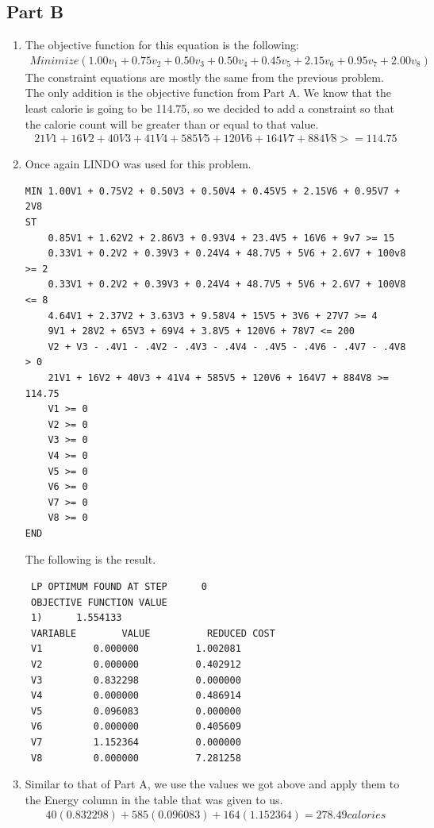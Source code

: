 \documentclass[11pt,letterpaper]{article}
\begin{document}
\subsection*{Part B}
\begin{enumerate}
	\item The objective function for this equation is the following:
	\begin{align*}
	Minimize(1.00v_1+0.75v_2+0.50v_3+0.50v_4+0.45v_5+2.15v_6+0.95v_7+2.00v_8)
	\end{align*}
	The constraint equations are mostly the same from the previous problem. The only addition is the objective function from Part A. We know that the least calorie is going to be 114.75, so we decided to add a constraint so that the calorie count will be greater than or equal to that value.
	\begin{align*}
	21V1 + 16V2 + 40V3 + 41V4 + 585V5 + 120V6 + 164V7 + 884V8 >= 114.75
	\end{align*}
	
	\item Once again LINDO was used for this problem.
	\begin{verbatim}
MIN 1.00V1 + 0.75V2 + 0.50V3 + 0.50V4 + 0.45V5 + 2.15V6 + 0.95V7 + 2V8
ST
	0.85V1 + 1.62V2 + 2.86V3 + 0.93V4 + 23.4V5 + 16V6 + 9v7 >= 15
	0.33V1 + 0.2V2 + 0.39V3 + 0.24V4 + 48.7V5 + 5V6 + 2.6V7 + 100v8 >= 2
	0.33V1 + 0.2V2 + 0.39V3 + 0.24V4 + 48.7V5 + 5V6 + 2.6V7 + 100V8 <= 8
	4.64V1 + 2.37V2 + 3.63V3 + 9.58V4 + 15V5 + 3V6 + 27V7 >= 4
	9V1 + 28V2 + 65V3 + 69V4 + 3.8V5 + 120V6 + 78V7 <= 200
	V2 + V3 - .4V1 - .4V2 - .4V3 - .4V4 - .4V5 - .4V6 - .4V7 - .4V8 > 0
	21V1 + 16V2 + 40V3 + 41V4 + 585V5 + 120V6 + 164V7 + 884V8 >= 114.75
	V1 >= 0 
	V2 >= 0
	V3 >= 0
	V4 >= 0
	V5 >= 0
	V6 >= 0
	V7 >= 0
	V8 >= 0
END
	\end{verbatim}

	The following is the result.
	\begin{verbatim}
 LP OPTIMUM FOUND AT STEP      0
 OBJECTIVE FUNCTION VALUE
 1)      1.554133
 VARIABLE        VALUE          REDUCED COST
 V1         0.000000          1.002081
 V2         0.000000          0.402912
 V3         0.832298          0.000000
 V4         0.000000          0.486914
 V5         0.096083          0.000000
 V6         0.000000          0.405609
 V7         1.152364          0.000000
 V8         0.000000          7.281258
	\end{verbatim}
	\item Similar to that of Part A, we use the values we got above and apply them to the Energy column in the table that was given to us.
	\begin{align*}
	40(0.832298) + 585(0.096083) + 164(1.152364) = 278.49 calories
	\end{align*} 
\end{enumerate}
\end{document}
